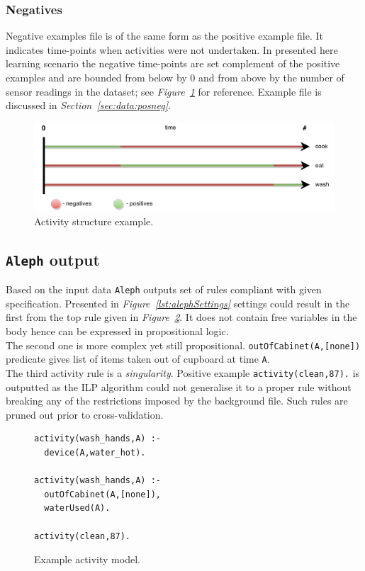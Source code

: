 \documentclass[10pt, a4paper, pdflatex, leqno, twoside, openright]{report}
\begin{document}
      \subsubsection{Negatives}
Negative examples file is of the same form as the positive example file. It indicates time-points when activities were not undertaken. In presented here learning scenario the negative time-points are set complement of the positive examples and are bounded from below by $0$ and from above by the number of sensor readings in the dataset; see \emph{Figure~\ref{fig:timepoints}} for reference. Example file is discussed in \emph{Section~\ref{sec:data:posneg}}.

\begin{figure}[htb]
  \centering
  \includegraphics[width=.85\textwidth]{./gfx/activityStructure}
  \caption{Activity structure example.\label{fig:timepoints}}
\end{figure}

    \subsection{\texttt{Aleph} output}
Based on the input data \texttt{Aleph} outputs set of rules compliant with given specification. Presented in \emph{Figure~\ref{lst:alephSettings}} settings could result in the first from the top rule given in \emph{Figure~\ref{lst:alephOut}}. It does not contain free variables in the body hence can be expressed in propositional logic.\\
The second one is more complex yet still propositional. \texttt{outOfCabinet(A,[none])} predicate gives list of items taken out of cupboard at time \texttt{A}.\\
The third activity rule is a \emph{singularity}. Positive example \texttt{activity(clean,87).} is outputted as the ILP algorithm could not generalise it to a proper rule without breaking any of the restrictions imposed by the background file. Such rules are pruned out prior to cross-validation.\\

\begin{figure}[htb] %
  \begin{verbatim}
activity(wash_hands,A) :-
  device(A,water_hot).

activity(wash_hands,A) :-
  outOfCabinet(A,[none]),
  waterUsed(A).

activity(clean,87).
  \end{verbatim}
  \caption{Example activity model.\label{lst:alephOut}}
\end{figure}
\end{document}
